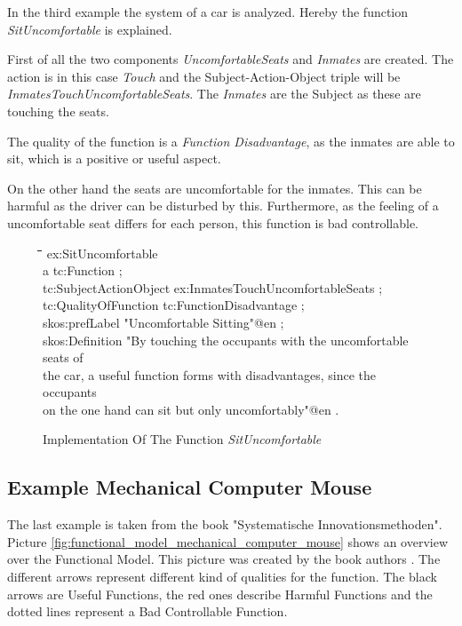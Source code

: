 \documentclass[11pt,a4paper]{article}
\newenvironment{code}{\tt \begin{tabbing}
\hskip12pt\=\hskip12pt\=\hskip12pt\=\hskip12pt\=\hskip5cm\=\hskip5cm\=\kill}
{\end{tabbing}}
\begin{document}
In the third example the system of a car is analyzed.  Hereby the function
\textit{SitUncomfortable} is explained.

First of all the two components \textit{UncomfortableSeats} and
\textit{Inmates} are created.  The action is in this case \textit{Touch} and
the Subject-Action-Object triple will be
\textit{InmatesTouchUncomfortableSeats}.  The \textit{Inmates} are the Subject
as these are touching the seats.

The quality of the function is a \textit{Function Disadvantage}, as the
inmates are able to sit, which is a positive or useful aspect.

On the other hand the seats are uncomfortable for the inmates.  This can be
harmful as the driver can be disturbed by this.  Furthermore, as the feeling
of a uncomfortable seat differs for each person, this function is bad
controllable.

\begin{figure}[ht]
  \centering
  \begin{code}
    ex:SitUncomfortable\\
    \> a tc:Function ;\\
    \> tc:SubjectActionObject ex:InmatesTouchUncomfortableSeats ;\\
    \> tc:QualityOfFunction tc:FunctionDisadvantage ;\\
    \> skos:prefLabel "Uncomfortable Sitting"@en ;\\
    \> skos:Definition "By touching the occupants with the uncomfortable seats of\\
    \> \> the car, a useful function forms with disadvantages, since the occupants\\
    \> \> on the one hand can sit but only uncomfortably"@en .
  \end{code}
  \caption{Implementation Of The Function \textit{SitUncomfortable}}
  \label{fig:implementation_function_sit_uncomfortable}
\end{figure}

\subsection{Example Mechanical Computer Mouse}

The last example is taken from the book "Systematische Innovationsmethoden".
Picture \ref{fig:functional_model_mechanical_computer_mouse} shows an overview
over the Functional Model.  This picture was created by the book authors
\cite{KS}.  The different arrows represent different kind of qualities for the
function.  The black arrows are Useful Functions, the red ones describe
Harmful Functions and the dotted lines represent a Bad Controllable Function.
\end{document}

